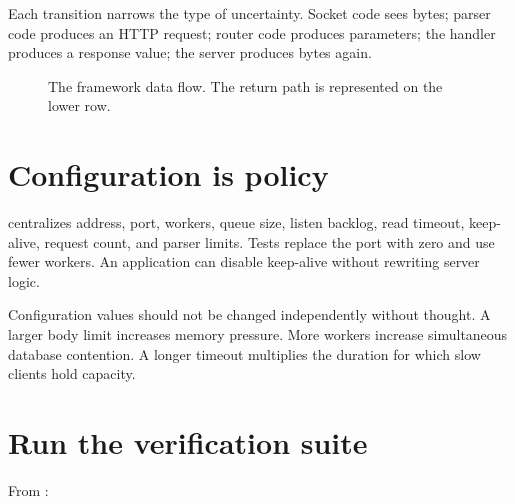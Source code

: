 Each transition narrows the type of uncertainty. Socket code sees bytes; parser
code produces an HTTP request; router code produces parameters; the handler
produces a response value; the server produces bytes again.

\begin{figure}[htbp]
\centering
{}
\caption{The framework data flow. The return path is represented on the lower row.}
\label{fig:framework-flow}
\end{figure}

\section{Configuration is policy}

 centralizes address, port, workers, queue size, listen backlog,
read timeout, keep-alive, request count, and parser limits. Tests replace the
port with zero and use fewer workers. An application can disable keep-alive
without rewriting server logic.

Configuration values should not be changed independently without thought. A
larger body limit increases memory pressure. More workers increase simultaneous
database contention. A longer timeout multiplies the duration for which slow
clients hold capacity.

\section{Run the verification suite}

From :

